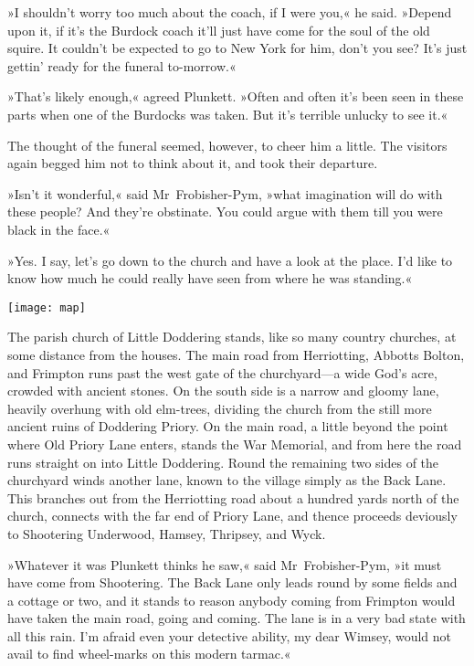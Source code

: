 »I shouldn't worry too much about the coach, if I were you,« he said. »Depend upon it, if it's the Burdock coach it'll just have come for the soul of the old squire. It couldn't be expected to go to New York for him, don't you see? It's just gettin' ready for the funeral to-morrow.«

»That's likely enough,« agreed Plunkett. »Often and often it's been seen in these parts when one of the Burdocks was taken. But it's terrible unlucky to see it.«

The thought of the funeral seemed, however, to cheer him a little. The visitors again begged him not to think about it, and took their departure.

»Isn't it wonderful,« said Mr~Frobisher-Pym, »what imagination will do with these people? And they're obstinate. You could argue with them till you were black in the face.«

»Yes. I say, let's go down to the church and have a look at the place. I'd like to know how much he could really have seen from where he was standing.«

\begin{sidewaysfigure}
\texttt{[image: map]}%
\end{sidewaysfigure}


The parish church of Little Doddering stands, like so many country churches, at some distance from the houses. The main road from Herriotting, Abbotts Bolton, and Frimpton runs past the west gate of the churchyard—a wide God's acre, crowded with ancient stones. On the south side is a narrow and gloomy lane, heavily overhung with old elm-trees, dividing the church from the still more ancient ruins of Doddering Priory. On the main road, a little beyond the point where Old Priory Lane enters, stands the War Memorial, and from here the road runs straight on into Little Doddering. Round the remaining two sides of the churchyard winds another lane, known to the village simply as the Back Lane. This branches out from the Herriotting road about a hundred yards north of the church, connects with the far end of Priory Lane, and thence proceeds deviously to Shootering Underwood, Hamsey, Thripsey, and Wyck.

»Whatever it was Plunkett thinks he saw,« said Mr~Frobisher-Pym, »it must have come from Shootering. The Back Lane only leads round by some fields and a cottage or two, and it stands to reason anybody coming from Frimpton would have taken the main road, going and coming. The lane is in a very bad state with all this rain. I'm afraid even your detective ability, my dear Wimsey, would not avail to find wheel-marks on this modern tarmac.«

